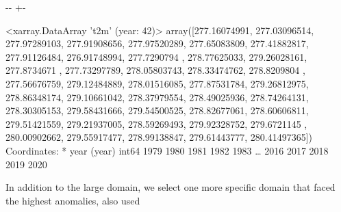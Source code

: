 \documentclass[letterpaper,10pt,english]{sphinxmanual}
\newlength\nbsphinxcodecellspacing
\begin{document}
{

\kern-\sphinxverbatimsmallskipamount\kern-\baselineskip
\kern+\FrameHeightAdjust\kern-\fboxrule
\vspace{\nbsphinxcodecellspacing}

\begin{sphinxVerbatim}[commandchars=\\\{\}]
\llap{\color{nbsphinxout}[35]:\,\hspace{\fboxrule}\hspace{\fboxsep}}<xarray.DataArray 't2m' (year: 42)>
array([277.16074991, 277.03096514, 277.97289103, 277.91908656,
       277.97520289, 277.65083809, 277.41882817, 277.91126484,
       276.91748994, 277.7290794 , 278.77625033, 279.26028161,
       277.8734671 , 277.73297789, 278.05803743, 278.33474762,
       278.8209804 , 277.56676759, 279.12484889, 278.01516085,
       277.87531784, 279.26812975, 278.86348174, 279.10661042,
       278.37979554, 278.49025936, 278.74264131, 278.30305153,
       279.58431666, 279.54500525, 278.82677061, 278.60606811,
       279.51421559, 279.21937005, 278.59269493, 279.92328752,
       279.6721145 , 280.00902662, 279.55917477, 278.99138847,
       279.61443777, 280.41497365])
Coordinates:
  * year     (year) int64 1979 1980 1981 1982 1983 {\ldots} 2016 2017 2018 2019 2020
\end{sphinxVerbatim}
}

In addition to the large domain, we select one more specific domain that faced the highest anomalies, also used 

{
\begin{sphinxVerbatim}[commandchars=\\\{\}]
\llap{\color{nbsphinxin}[36]:\,\hspace{\fboxrule}\hspace{\fboxsep}}  
    \PYG{p}{[}\PYG{p}{]}  
                 
             
    \PYG{p}{[} \PYG{p}{]}
\end{sphinxVerbatim}
}
\end{document}
